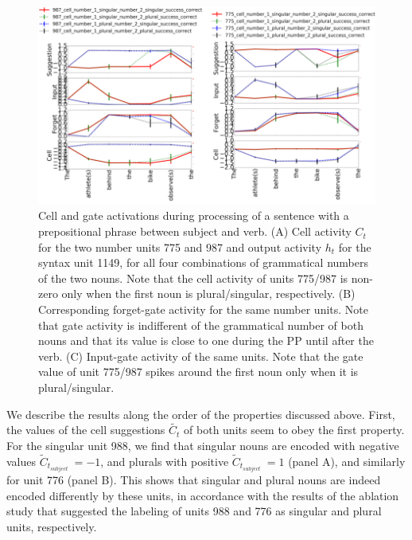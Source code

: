 \begin{figure}[ht]
\includegraphics[width=\textwidth]{Figures/Figure2_number_units_775_987.png}
\caption{Cell and gate activations during processing of a sentence with a prepositional phrase between subject and verb. (A) Cell activity $C_t$ for the two number units 775 and 987 and output activity $h_t$ for the syntax unit 1149, for all four combinations of grammatical numbers of the two nouns. Note that the cell activity of units 775/987 is non-zero only when the first noun is plural/singular, respectively. (B) Corresponding forget-gate activity for the same number units. Note that gate activity is indifferent of the grammatical number of both nouns and that its value is close to one during the PP until after the verb. (C) Input-gate activity of the same units. Note that the gate value of unit 775/987 spikes around the first noun only when it is plural/singular.}
\end{figure}


We describe the results along the order of the properties discussed above. First, the values of the cell suggestions $\tilde{C_t}$ of both units seem to obey the first property. For the singular unit 988, we find that singular nouns are encoded with negative values $\tilde{C}_{t_{subject}}~=-1$, and plurals with positive $\tilde{C}_{t_{subject}}~=1$ (panel A), and similarly for unit 776 (panel B). This shows that singular and plural nouns are indeed encoded differently by these units, in accordance with the results of the ablation study that suggested the labeling of units 988 and 776 as singular and plural units, respectively.

